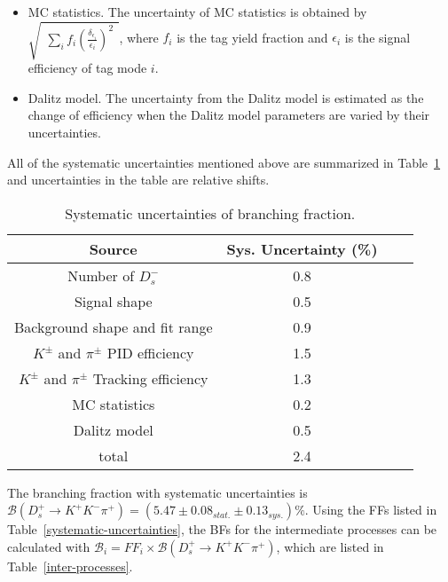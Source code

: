 {\begin{itemize}
    \item MC statistics. The uncertainty of MC statistics is obtained by $\sqrt{ \begin{matrix} \sum_{i} f_{i}{(\frac{\delta_{\epsilon_{i}}}{\epsilon_{i}})}^{2}\end{matrix}}$, where $f_{i}$ is the tag yield fraction and $\epsilon_{i}$ is the signal efficiency of tag mode $i$.
        \item Dalitz model. The uncertainty from the Dalitz model is estimated as the change of efficiency when the Dalitz model parameters are varied by their uncertainties.
    \end{itemize}

    All of the systematic uncertainties mentioned above are summarized in Table~\ref{BF-Sys} and uncertainties in the table are relative shifts.
    \begin{table}[htbp]
        \caption{Systematic uncertainties of branching fraction.}
        \label{BF-Sys}
        \begin{center}
            \begin{tabular}{cccc}
                \toprule\toprule
                Source   & Sys. Uncertainty (\%)\\
                \hline
                Number of $D_{s}^{-}$               & 0.8 \\
                Signal shape                        & 0.5 \\
                Background shape and fit range      & 0.9 \\
                $K^{\pm}$ and $\pi^{\pm}$ PID efficiency            & 1.5 \\
                $K^{\pm}$ and $\pi^{\pm}$ Tracking efficiency       & 1.3 \\
                MC statistics                       & 0.2 \\
                \hline
                Dalitz model                               & 0.5 \\
                \hline
                total                               & 2.4 \\
                \bottomrule\bottomrule
            \end{tabular}
        \end{center}
    \end{table}

    The branching fraction with systematic uncertainties is $\mathcal{B}(D_{s}^{+} \rightarrow K^{+}K^{-}\pi^{+})=(5.47\pm0.08_{stat.}\pm0.13_{sys.})\%$.
    Using the FFs listed in Table~\ref{systematic-uncertainties}, the BFs for the intermediate processes can be calculated with $\mathcal{B}_{i} = FF_{i} \times \mathcal{B}(D_{s}^{+} \rightarrow K^{+}K^{-}\pi^{+})$, which are listed in Table~\ref{inter-processes}.  
    
}
